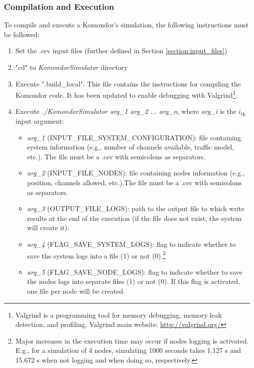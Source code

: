\documentclass[a4paper]{article}
\begin{document}
		\subsubsection{Compilation and Execution}
		\label{section:compilation_execution}
		To compile and execute a Komondor's simulation, the following instructions must	be followed:
		\begin{enumerate}
			\item Set the .csv input files (further defined in Section \ref{section:input_files})
			\item "cd" to \textit{KomondorSimulator} directory
		    \item Execute ".build\_local". This file contains the instructions for compiling the Komondor code. It has been updated to enable debugging with Valgrind\footnote{Valgrind is a programming tool for memory debugging, memory leak detection, and profiling. Valgrind main website: \url{http://valgrind.org/}}.
		    \item Execute \textit{./KomondorSimulator arg\_1 arg\_2 ... arg\_n}, where \textit{arg\_i} is the $i_{\text{th}}$ input argument:
		    	\begin{itemize}		            
		            \item \textit{arg\_1} (INPUT\_FILE\_SYSTEM\_CONFIGURATION): file containing system information (e.g., number of channels available, traffic model, etc.). The file must be a .csv with semicolons as separators.
		            \item \textit{arg\_2} (INPUT\_FILE\_NODES): file containing nodes information (e.g., position, channels allowed, etc.).The file must be a .csv with semicolons as separators.
		            \item \textit{arg\_3} (OUTPUT\_FILE\_LOGS): path to the output file to which write results at the end of the execution (if the file does not exist, the system will create it).
		            \item \textit{arg\_4} (FLAG\_SAVE\_SYSTEM\_LOGS): flag to indicate whether to save the system logs into a file (1) or not (0).\footnote{Major increases in the execution time may occur if nodes logging is activated. E.g., for a simulation of 4 nodes, simulating 1000 seconds takes 1.127 s and 15.672 s when not logging and when doing so, respectively.}
		            \item \textit{arg\_5} (FLAG\_SAVE\_NODE\_LOGS): flag to indicate whether to save the nodes logs into separate files (1) or not (0). If this flag is activated, one file per node will be created.

\end{itemize}
\end{enumerate}
\end{document}
